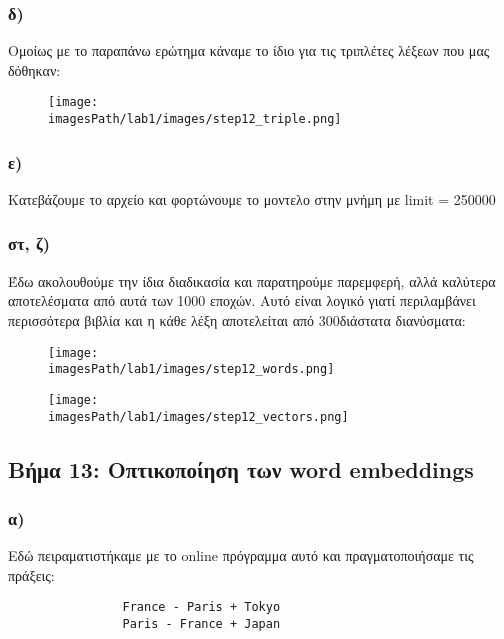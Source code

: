 \documentclass[a4paper, 12pt]{article}
\newcommand{\imagesPath}{.}
\begin{document}
        \subsubsection*{δ)} 
        	Ομοίως με το παραπάνω ερώτημα κάναμε το ίδιο για τις τριπλέτες λέξεων που μας δόθηκαν: 
			
			\begin{figure}[H]
				\texttt{[image: \\imagesPath/lab1/images/step12\_triple.png]}
			\end{figure}

        \subsubsection*{ε)}
	        Κατεβάζουμε το αρχείο  και φορτώνουμε το μοντελο στην μνήμη  με limit = 250000
        
        \subsubsection*{στ, {ζ)}}
	        Έδω ακολουθούμε την ίδια διαδικασία και παρατηρούμε παρεμφερή, αλλά καλύτερα αποτελέσματα από αυτά των 1000 εποχών. Αυτό είναι λογικό γιατί περιλαμβάνει περισσότερα βιβλία και η κάθε λέξη αποτελείται από 300διάστατα διανύσματα: 
	        
        \begin{figure}[H]
        	\texttt{[image: \\imagesPath/lab1/images/step12\_words.png]}
        \end{figure}
        
        \begin{figure}[H]
        	\texttt{[image: \\imagesPath/lab1/images/step12\_vectors.png]}
        \end{figure}       
        
    \subsection*{Βήμα 13: Οπτικοποίηση των word embeddings}
        \subsubsection*{α)}
        	Εδώ πειραματιστήκαμε με το online πρόγραμμα αυτό και πραγματοποιήσαμε τις πράξεις:
        	
        	\begin{verbatim}
				France - Paris + Tokyo
				Paris - France + Japan
        	\end{verbatim}
        	
\end{document}
